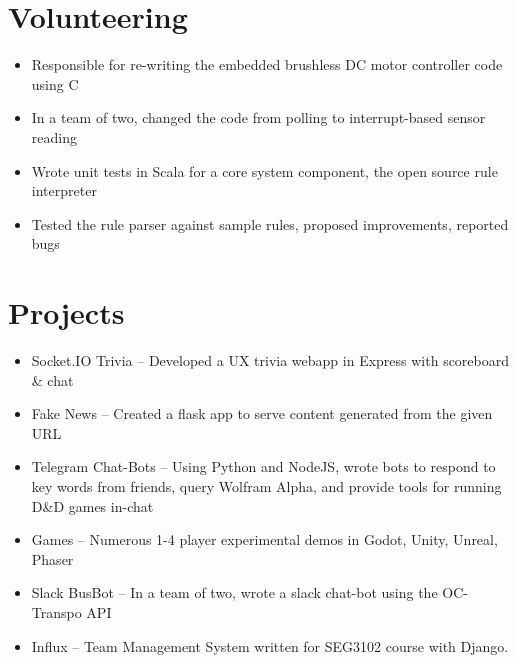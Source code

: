 \documentclass[]{rcf_cv}
\begin{document}
	\section{Volunteering}
	
		\begin{itemize}
			\setlength\itemsep{-0.4em}
			\renewcommand\labelitemi{--}
			
			\item Responsible for re-writing the embedded brushless DC motor controller code using C
			\item In a team of two, changed the code from polling to interrupt-based sensor reading
			
		\end{itemize}
	
		\begin{itemize}
			\setlength\itemsep{-0.4em}
			\renewcommand\labelitemi{--}
			
			\item Wrote unit tests in Scala for a core system component, the open source rule interpreter
			\item Tested the rule parser against sample rules, proposed improvements, reported bugs

		\end{itemize}

	


	
	\section{Projects}
		\begin{itemize}
			\setlength\itemsep{-0.4em}
			\renewcommand\labelitemi{--}
			
			
			\item Socket.IO Trivia -- Developed a UX trivia webapp in Express with scoreboard \& chat
			
			\item Fake News -- Created a flask app to serve content generated from the given URL
			
			\item Telegram Chat-Bots -- Using Python and NodeJS, wrote bots to respond to key words from friends, query Wolfram Alpha, and provide tools for running D\&D games in-chat
			
			\item Games -- Numerous 1-4 player experimental demos in Godot, Unity, Unreal, Phaser
			
			\item Slack BusBot -- In a team of two, wrote a slack chat-bot using the OC-Transpo API
			
			\item Influx -- Team Management System written for SEG3102 course with Django.
			
		\end{itemize}
\end{document}
